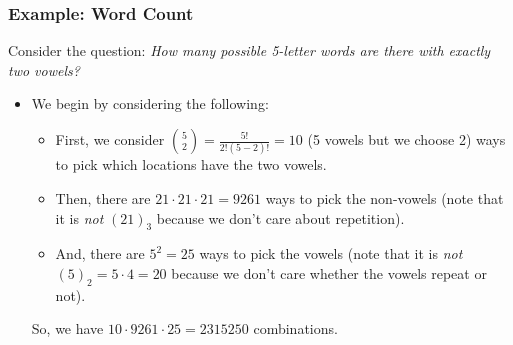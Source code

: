 \documentclass[letterpaper]{article}
\begin{document}
\subsubsection{Example: Word Count}
Consider the question: \emph{How many possible 5-letter words are there with exactly two vowels?}
\begin{itemize}
    \item We begin by considering the following:
    \begin{itemize}
        \item First, we consider $\binom{5}{2} = \frac{5!}{2!(5 - 2)!} = 10$ (5 vowels but we choose 2) ways to pick which locations have the two vowels.
        \item Then, there are $21 \cdot 21 \cdot 21 = 9261$ ways to pick the non-vowels (note that it is \emph{not} $(21)_3$ because we don't care about repetition).
        \item And, there are $5^2 = 25$ ways to pick the vowels (note that it is \emph{not} $(5)_2 = 5 \cdot 4 = 20$ because we don't care whether the vowels repeat or not). 
    \end{itemize}
    So, we have $10 \cdot 9261 \cdot 25 = \boxed{2315250}$ combinations.
\end{itemize}








\newpage 
\end{document}
